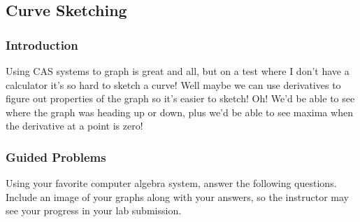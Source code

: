 \documentclass{ximera}
\begin{document}
\subsection{Curve Sketching}
\subsubsection{Introduction}
\begin{dialogue}
 Using CAS systems to graph is great and all, but on a test where I don't have a calculator it's so hard to sketch a curve!
 Well maybe we can use derivatives to figure out properties of the graph so it's easier to sketch!
 Oh! We'd be able to see where the graph was heading up or down, plus we'd be able to see maxima when the derivative at a point is zero!
\end{dialogue}
\subsubsection{Guided Problems}
Using your favorite computer algebra system, answer the following questions. Include an image of your graphs along with your answers, so the instructor may see your progress in your lab submission. 
\end{document}
